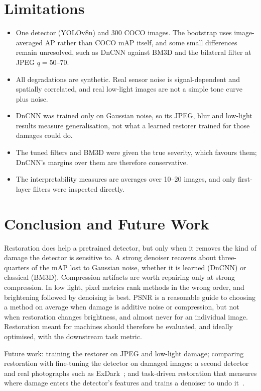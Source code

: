 \documentclass[11pt]{article}
\begin{document}
\section{Limitations}
\label{sec:limits}
\begin{itemize}
  \item One detector (YOLOv8n) and 300 COCO images. The bootstrap uses image-averaged AP rather than COCO mAP itself, and some small differences remain unresolved, such as DnCNN against BM3D and the bilateral filter at JPEG $q = 50$--70.
  \item All degradations are synthetic. Real sensor noise is signal-dependent and spatially correlated, and real low-light images are not a simple tone curve plus noise.
  \item DnCNN was trained only on Gaussian noise, so its JPEG, blur and low-light results measure generalisation, not what a learned restorer trained for those damages could do.
  \item The tuned filters and BM3D were given the true severity, which favours them; DnCNN's margins over them are therefore conservative.
  \item The interpretability measures are averages over 10--20 images, and only first-layer filters were inspected directly.
\end{itemize}

\section{Conclusion and Future Work}
\label{sec:conclusion}
Restoration does help a pretrained detector, but only when it removes the kind of damage the detector is sensitive to. A strong denoiser recovers about three-quarters of the mAP lost to Gaussian noise, whether it is learned (DnCNN) or classical (BM3D). Compression artifacts are worth repairing only at strong compression. In low light, pixel metrics rank methods in the wrong order, and brightening followed by denoising is best. PSNR is a reasonable guide to choosing a method on average when damage is additive noise or compression, but not when restoration changes brightness, and almost never for an individual image. Restoration meant for machines should therefore be evaluated, and ideally optimised, with the downstream task metric.

Future work: training the restorer on JPEG and low-light damage; comparing restoration with fine-tuning the detector on damaged images; a second detector and real photographs such as ExDark~\citep{loh2019exdark}; and task-driven restoration that measures where damage enters the detector's features and trains a denoiser to undo it~\citep{liu2018denoising,diamond2021dirty}.
\end{document}

